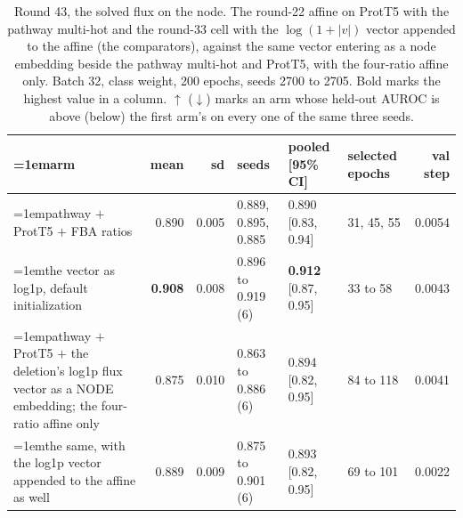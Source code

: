 \begin{table}[H]
  \centering
  \scriptsize
  \setlength{\tabcolsep}{2.5pt}
  \caption[Round 43, the solved flux on the node]{Round 43, the solved flux on the node. The round-22 affine on ProtT5 with the pathway multi-hot and the round-33 cell with the $\log(1 + |v|)$ vector appended to the affine (the comparators), against the same vector entering as a node embedding beside the pathway multi-hot and ProtT5, with the four-ratio affine only. Batch 32, class weight, 200 epochs, seeds 2700 to 2705. Bold marks the highest value in a column. $\uparrow$ ($\downarrow$) marks an arm whose held-out AUROC is above (below) the first arm's on every one of the same three seeds.}
  \label{tab:w59}
  \begin{tabular}{@{}>{\raggedright\hangindent=1em\hangafter=1\arraybackslash}p{83.4mm}rrlllr@{}}
    \hline
    arm & mean & sd & seeds & pooled [95\% CI] & selected epochs & val step \\
    \hline
    pathway $+$ ProtT5 $+$ FBA ratios & 0.890 & 0.005 & 0.889, 0.895, 0.885 & 0.890 [0.83, 0.94] & 31, 45, 55 & 0.0054 \\
    the vector as log1p, default initialization & \textbf{0.908} & 0.008 & 0.896 to 0.919 (6) & \textbf{0.912} [0.87, 0.95] & 33 to 58 & 0.0043 \\
    pathway $+$ ProtT5 $+$ the deletion's log1p flux vector as a NODE embedding; the four-ratio affine only & 0.875 & 0.010 & 0.863 to 0.886 (6) & 0.894 [0.82, 0.95] & 84 to 118 & 0.0041 \\
    the same, with the log1p vector appended to the affine as well & 0.889 & 0.009 & 0.875 to 0.901 (6) & 0.893 [0.82, 0.95] & 69 to 101 & 0.0022 \\
    \hline
  \end{tabular}
\end{table}
